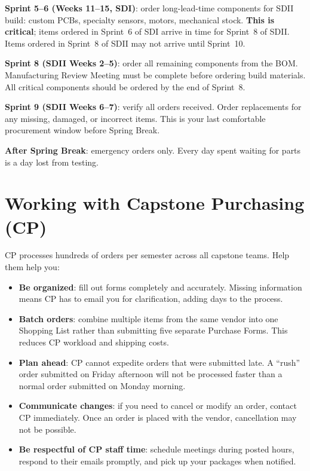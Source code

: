 \textbf{Sprint 5--6 (Weeks 11--15, SDI)}: order long-lead-time components for SDII build: custom PCBs, specialty sensors, motors, mechanical stock. \textbf{This is critical}; items ordered in Sprint~6 of SDI arrive in time for Sprint~8 of SDII. Items ordered in Sprint~8 of SDII may not arrive until Sprint~10.

\textbf{Sprint 8 (SDII Weeks 2--5)}: order all remaining components from the BOM. Manufacturing Review Meeting must be complete before ordering build materials. All critical components should be ordered by the end of Sprint~8.

\textbf{Sprint 9 (SDII Weeks 6--7)}: verify all orders received. Order replacements for any missing, damaged, or incorrect items. This is your last comfortable procurement window before Spring Break.

\textbf{After Spring Break}: emergency orders only. Every day spent waiting for parts is a day lost from testing.

\section{Working with Capstone Purchasing (CP)}
CP processes hundreds of orders per semester across all capstone teams. Help them help you:

\begin{itemize}[nosep,leftmargin=1.5em]
\item \textbf{Be organized}: fill out forms completely and accurately. Missing information means CP has to email you for clarification, adding days to the process.
\item \textbf{Batch orders}: combine multiple items from the same vendor into one Shopping List rather than submitting five separate Purchase Forms. This reduces CP workload and shipping costs.
\item \textbf{Plan ahead}: CP cannot expedite orders that were submitted late. A ``rush'' order submitted on Friday afternoon will not be processed faster than a normal order submitted on Monday morning.
\item \textbf{Communicate changes}: if you need to cancel or modify an order, contact CP immediately. Once an order is placed with the vendor, cancellation may not be possible.
\item \textbf{Be respectful of CP staff time}: schedule meetings during posted hours, respond to their emails promptly, and pick up your packages when notified.
\end{itemize}



